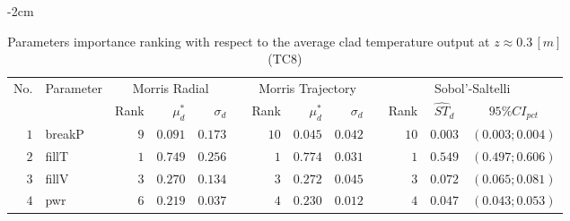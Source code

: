 \begin{table*}[!htbp]\centering
{}
\begin{adjustwidth*}{}{-2cm}
\caption{Parameters importance ranking with respect to the average clad temperature output at $z \approx 0.3 \, [m]$ (TC$8$)}
\label{tab:app_screening_tc8_average}
\begin{tabular}{@{}rlrrrrrrrrrcc@{}}\toprule
\multirow{2}{*}{\footnotesize{No.}} & \multirow{2}{*}{\footnotesize{Parameter}} & \multicolumn{3}{c}{\footnotesize{Morris Radial}} & \phantom{a} & \multicolumn{3}{c}{\footnotesize{Morris Trajectory}}  &\phantom{a}& \multicolumn{3}{c}{\footnotesize{Sobol'-Saltelli}}                               \\             
                                                                                  \cmidrule{3-5}                                                   \cmidrule{7-9}                                                      \cmidrule{11-13}
                                    &                                           & \footnotesize{Rank}   & $\mu^*_d$ & $\sigma_d$   &             & \footnotesize{Rank} & $\mu^*_d$ & $\sigma_d$          &           & \footnotesize{Rank} & \footnotesize{$\hat{ST}_d$} & \footnotesize{$95\%CI_{pct}$}\\ \midrule
\footnotesize{$1 $} & \footnotesize{breakP   } & \footnotesize{$9 $} & \footnotesize{$0.091$} & \footnotesize{$0.173$} && \footnotesize{$10$} & \footnotesize{$0.045$} & \footnotesize{$0.042$} && \footnotesize{$10$} & \footnotesize{$0.003$} & \footnotesize{$(0.003;0.004)$} \\
\footnotesize{$2 $} & \footnotesize{fillT    } & \footnotesize{$1 $} & \footnotesize{$0.749$} & \footnotesize{$0.256$} && \footnotesize{$1 $} & \footnotesize{$0.774$} & \footnotesize{$0.031$} && \footnotesize{$1 $} & \footnotesize{$0.549$} & \footnotesize{$(0.497;0.606)$} \\
\footnotesize{$3 $} & \footnotesize{fillV    } & \footnotesize{$3 $} & \footnotesize{$0.270$} & \footnotesize{$0.134$} && \footnotesize{$3 $} & \footnotesize{$0.272$} & \footnotesize{$0.045$} && \footnotesize{$3 $} & \footnotesize{$0.072$} & \footnotesize{$(0.065;0.081)$} \\
\footnotesize{$4 $} & \footnotesize{pwr      } & \footnotesize{$6 $} & \footnotesize{$0.219$} & \footnotesize{$0.037$} && \footnotesize{$4 $} & \footnotesize{$0.230$} & \footnotesize{$0.012$} && \footnotesize{$4 $} & \footnotesize{$0.047$} & \footnotesize{$(0.043;0.053)$} \\

\end{tabular}
\end{adjustwidth*}
\end{table*}
